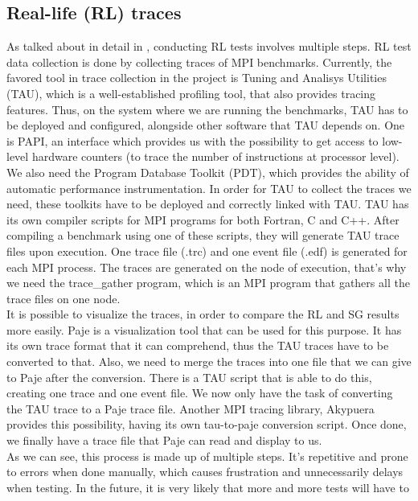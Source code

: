 \subsection{Real-life (RL) traces}
\label{sec:rl_traces}
As talked about in detail in \cite{ms11}, conducting RL tests involves
multiple steps. RL test data collection is done by collecting traces
of MPI benchmarks. Currently, the favored tool in trace collection in
the project is Tuning and Analisys Utilities (TAU)\cite{sm06}, which
is a well-established profiling tool, that also provides tracing
features. Thus, on the system
where we are running the benchmarks, TAU has to be deployed and
configured, alongside other software that TAU depends on. One is
PAPI\cite{mbdh99}\cite{lmmsl01},
an interface which provides us with the possibility to
get access to low-level hardware counters (to trace the number of
instructions at processor level). We also need the Program Database
Toolkit (PDT)\cite{lcmsmrr00}, which provides the ability of automatic
performance
instrumentation. In order for TAU to collect the traces we need, these
toolkits have to be deployed and correctly linked with TAU. TAU has
its own compiler scripts for MPI programs for both Fortran, C and
C++. After compiling a benchmark using one of these scripts, they will
generate TAU trace files upon execution. One trace file (.trc)
and one event file (.edf) is generated for each MPI process. The
traces are generated on the node of execution, that's why we need the
trace\_gather program\cite{ms11}, which is an MPI program that gathers
all the trace files on one node.\\
It is possible to visualize the traces, in order to compare the RL and SG
results more easily. Paje is a visualization tool that can be used for
this purpose. It has its own trace format that it can comprehend, thus
the TAU traces have to be converted to that. Also, we need to merge
the traces into one file that we can give to Paje after the
conversion. There is a TAU script that is able to do this, creating
one trace and one event file. We now only have the task of converting
the TAU trace to a Paje trace file. Another MPI tracing library,
Akypuera\cite{s13} provides this possibility, having its own
tau-to-paje conversion script. Once done, we finally have a trace file
that Paje can read and display to us.\\
As we can see, this process is made up of multiple steps. It's
repetitive and prone to errors when done manually, which causes
frustration and unnecessarily delays when testing.
In the future, it is very likely that more and more tests will have to
